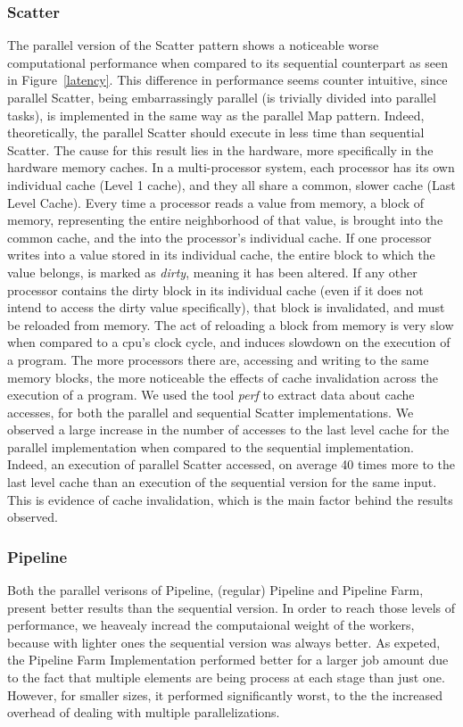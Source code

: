 \documentclass[conference,compsoc]{IEEEtran}
\begin{document}
\subsubsection{Scatter}
The parallel version of the Scatter pattern shows a noticeable worse computational performance when compared to its sequential counterpart as seen in Figure~\ref{latency}. This difference in performance seems counter intuitive, since parallel Scatter, being embarrassingly parallel (is trivially divided into parallel tasks), is implemented in the same way as the parallel Map pattern. Indeed, theoretically, the parallel Scatter should execute in less time than sequential Scatter. The cause for this result lies in the hardware, more specifically in the hardware memory caches. In a multi-processor system, each processor has its own individual cache (Level 1 cache), and they all share a common, slower cache (Last Level Cache). Every time a processor reads a value from memory, a block of memory, representing the entire neighborhood of that value, is brought into the common cache, and the into the processor's individual cache. If one processor writes into a value stored in its individual cache, the entire block to which the value belongs, is marked as \emph{dirty}, meaning it has been altered. If any other processor contains the dirty block in its individual cache (even if it does not intend to access the dirty value specifically), that block is invalidated, and must be reloaded from memory. The act of reloading a block from memory is very slow when compared to a cpu's clock cycle, and induces slowdown on the execution of a program. The more processors there are, accessing and writing to the same memory blocks, the more noticeable the effects of cache invalidation across the execution of a program. We used the tool \emph{perf} to extract data about cache accesses, for both the parallel and sequential Scatter implementations. We observed a large increase in the number of accesses to the last level cache for the parallel implementation when compared to the sequential implementation. Indeed, an execution of parallel Scatter accessed, on average 40 times more to the last level cache than an execution of the sequential version for the same input. This is evidence of cache invalidation, which is the main factor behind the results observed.

\subsubsection{Pipeline}
Both the parallel verisons of Pipeline, (regular) Pipeline and Pipeline Farm, present better results than the sequential version. In order to reach those levels of performance, we heavealy incread the computaional weight of the workers, because with lighter ones the sequential version was always better. As expeted, the Pipeline Farm Implementation performed better for a larger job amount due to the fact that multiple elements are being process at each stage than just one. However, for smaller sizes, it performed significantly worst, to the the increased overhead of dealing with multiple parallelizations.
\end{document}
